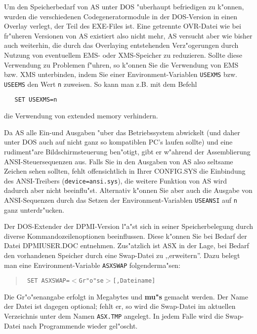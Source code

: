 \documentclass[12pt,a4paper,twoside]{report}
\newcommand{\bb}[1]{{\bf #1}}
\newcommand{\tty}[1]{{\tt #1}}
\begin{document}
Um den  Speicherbedarf von AS unter DOS "uberhaupt
befriedigen zu k"onnen, wurden die verschiedenen Codegeneratormodule in
der DOS-Version in einen Overlay verlegt, der Teil des EXE-Files ist. 
Eine getrennte OVR-Datei wie bei fr"uheren Versionen von AS existiert also
nicht mehr, AS versucht aber wie bisher auch weiterhin, die durch das
Overlaying entstehenden Verz"ogerungen durch Nutzung von eventuellem EMS-
oder XMS-Speicher zu reduzieren.  Sollte diese Verwendung zu Problemen
f"uhren, so k"onnen Sie die Verwendung von EMS bzw. XMS unterbinden, indem
Sie einer Environment-Variablen \tty{USEXMS} bzw. \tty{USEEMS} den Wert
\tty{n} zuweisen.  So kann man z.B. mit dem Befehl
\begin{verbatim}
   SET USEXMS=n
\end{verbatim}
die Verwendung von extended memory verhindern.
\par
Da AS alle Ein-und Ausgaben "uber das Betriebssystem abwickelt (und daher
unter DOS auch auf nicht ganz so kompatiblen PC's laufen sollte) und eine
rudiment"are Bildschirmsteuerung ben"otigt, gibt er w"ahrend der
Assemblierung ANSI-Steuersequenzen aus.  
Falls Sie in den Ausgaben von AS  also seltsame
Zeichen sehen sollten, fehlt offensichtlich in Ihrer CONFIG.SYS die
Einbindung des ANSI-Trei\-bers (\tty{device=\-ansi.sys}), die weitere Funktion
von AS  wird dadurch aber nicht beeinflu"st. Alternativ
k"onnen Sie aber auch die Ausgabe von ANSI-Sequenzen durch das Setzen der
Environment-Variablen \tty{USEANSI} auf \tty{n} ganz unterdr"ucken.

Der DOS-Extender der DPMI-Version  l"a"st sich in
seiner Speicherbelegung durch diverse Kommandozeilenoptionen beeinflussen. 
Diese k"onnen Sie bei Bedarf der Datei DPMIUSER.DOC entnehmen. 
Zus"atzlich ist ASX in der Lage, bei Bedarf den vorhandenen Speicher
durch eine Swap-Datei zu ,,erweitern''.  Dazu belegt man eine
Environment-Variable \tty{ASXSWAP} folgenderma"sen:
\begin{quote}{\tt
  SET ASXSWAP=$<$Gr"o"se$>$[,Dateiname]
}\end{quote}
Die Gr"o"senangabe erfolgt in Megabytes und \bb{mu"s} gemacht werden.  Der
Name der Datei ist dagegen optional; fehlt er, so wird die Swap-Datei im
aktuellen Verzeichnis unter dem Namen \tty{ASX.TMP} angelegt.  In jedem
Falle wird die Swap-Datei nach Programmende wieder gel"oscht.
\end{document}
